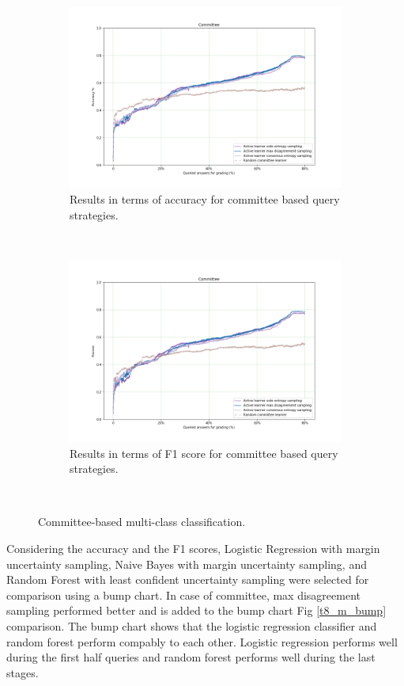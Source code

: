 \begin{figure}[!htb]
	\begin{subfigure}[b]{0.5\textwidth}
		\includegraphics[width=\textwidth]{images/task8_accuracy_com}
		\caption{Results in terms of accuracy for committee based query strategies.}
		\label{t8_m_com}
	\end{subfigure}
	~
	\begin{subfigure}[b]{0.5\textwidth}
		\includegraphics[width=\textwidth]{images/task8_f1score_com}
		\caption{Results in terms of F1 score for committee based query strategies.}
		\label{t8_m_com_f1}
	\end{subfigure}
	~
	\caption{Committee-based multi-class classification.}
\end{figure}

Considering the accuracy and the F1 scores, Logistic Regression with margin uncertainty sampling, Naive Bayes with margin uncertainty sampling, and Random Forest with least confident uncertainty sampling were selected for comparison using a bump chart. In case of committee, max disagreement sampling performed better and is added to the bump chart Fig \ref{t8_m_bump} comparison. The bump chart shows that the logistic regression classifier and random forest perform compably to each other. Logistic regression performs well during the first half queries and random forest performs well during the last stages.

